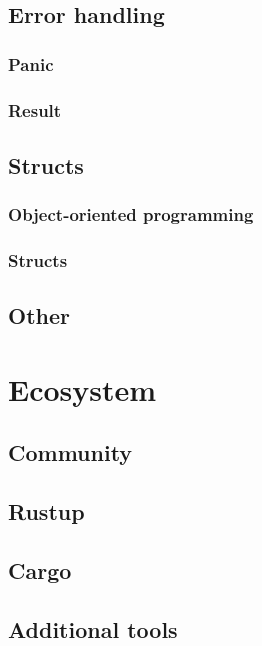 \documentclass[%
final,
xcolor = table,
usenames,
dvipsnames,
table,
aspectratio = 169]{beamer}
\begin{document}
\subsection{Error handling}

\subsubsection{Panic}

\subsubsection{Result}


\subsection{Structs}
\subsubsection{Object-oriented programming}

\subsubsection{Structs}


\subsection{Other}



\section{Ecosystem}
\subsection{Community}


\subsection{Rustup}

\subsection{Cargo}


\subsection{Additional tools}

\end{document}
